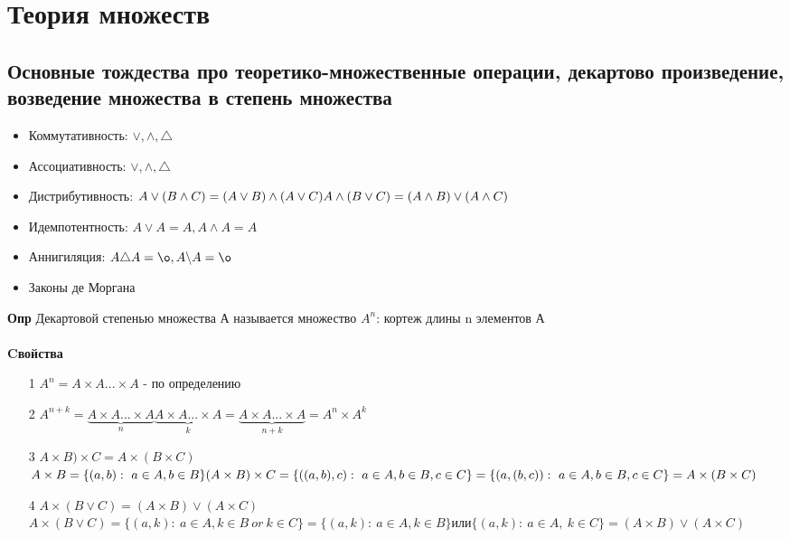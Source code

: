 \section{Теория множеств}

\subsection{Основные тождества про теоретико-множественные операции, декартово произведение, возведение множества в степень множества}
\begin{itemize}
    \item Коммутативность: $\vee, \wedge, \triangle$
    \item Ассоциативность: $\vee, \wedge, \triangle$
    \item Дистрибутивность: $ \\ A \vee (B \wedge C) = (A \vee B) \wedge (A \vee C) \\ A \wedge (B \vee C) = (A \wedge B) \vee (A \wedge C)$
    \item Идемпотентность: $A \vee A = A, A\wedge A = A$
    \item Аннигиляция: $A \triangle A = \o, A \backslash A = \o$
    \item Законы де Моргана
\end{itemize}
\textbf{Опр} Декартовой степенью множества А называется множество $A^n$: кортеж длины n элементов А
\\
\\
\textbf{Cвойства}
\begin{itemize}
    \item [1] $A^n = A\times A... \times A$ - по определению
     \item [2] $A^{n+k} = \underbrace{A\times A... \times A}_{n}\underbrace{A\times A... \times A}_{k} = \underbrace{A\times A... \times A}_{n+k} = A^n \times A^k$ 
     \item [3] $A\times B)\times C = A \times( B \times C )$\\
     $A \times B = \{(a,b): \ a \in A, b\in B\} \\ (A \times B ) \times C = \{((a,b),c): \ a \in A, b\in B, c \in C\} = \{(a,(b,c)): \ a \in A, b\in B, c \in C\} = A\times (B \times C)$
     \item[4] $A\times (B \vee C) = (A \times B) \vee (A \times C)$ \\ $A \times(B \vee C) = \{ (a,k): \ a \in A, k \in B \ or\ k\in C\} =  \{ (a,k): \ a \in A, k \in B \} $или$\{ (a,k): \ a \in A,\ k\in C\} = (A \times B) \vee (A \times C) $
\end{itemize}

